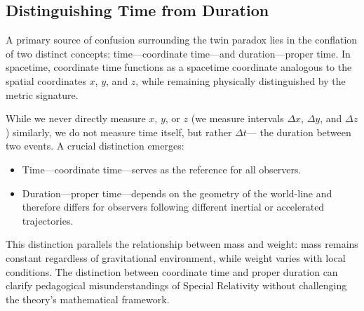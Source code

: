 \documentclass[pdflatex,sn-basic]{sn-jnl}
\theoremstyle{thmstyleone}%
\theoremstyle{thmstyletwo}%
\theoremstyle{thmstylethree}%
\begin{document}
	\subsection{Distinguishing Time from Duration}\label{subsec3_1}
    	A primary source of confusion surrounding the twin paradox lies in the conflation of two distinct concepts: time—coordinate time—and duration—proper time. In spacetime, coordinate time functions as a spacetime coordinate analogous to the spatial coordinates  $x$, $y$, and $z$, while remaining physically distinguished by the metric signature.
	
	While we never directly measure $x$, $y$, or $z$ (we measure intervals $\Delta x$, $\Delta y$, and $\Delta z$) similarly, we do not measure time itself, but rather  $\Delta t$— the duration between two events.
	A crucial distinction emerges:
		\begin{itemize}
			\item Time—coordinate time—serves as the reference for all observers.
			\item Duration—proper time—depends on the geometry of the world-line and therefore differs for observers following different inertial or accelerated trajectories.
		\end{itemize}
    	This distinction parallels the relationship between mass and weight: mass remains constant regardless of gravitational environment, while weight varies with local conditions. The distinction between coordinate time and proper duration can clarify pedagogical misunderstandings of Special Relativity without challenging the theory's mathematical framework.
\end{document}
